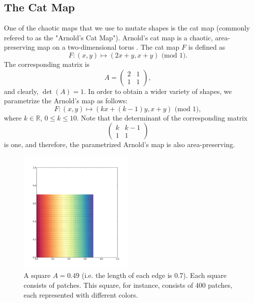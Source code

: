 \documentclass[12pt,draft]{reedmcm}
\begin{document}
\subsection{The Cat Map}
One of the chaotic maps that we use to mutate shapes is the cat map (commonly refered to as the "Arnold's Cat Map").
Arnold's cat map is a chaotic, area-preserving map on a two-dimensional torus \citep{hilborn}.
The cat map $F$ is defined as
\begin{equation*}
  F: (x,y) \mapsto (2x + y, x + y) \mbox{ (mod 1)}.
\end{equation*}
The corresponding matrix is
\begin{equation*}
A =
\begin{pmatrix}
    2 & 1  \\
    1 & 1  
  \end{pmatrix},
\end{equation*}
and clearly, $\det(A) = 1$.
In order to obtain a wider variety of shapes, we parametrize the Arnold's map as follows:
\begin{equation*}
  F: (x,y) \mapsto (kx + (k-1)y, x + y) \mbox{ (mod 1)},
\end{equation*}
where $k \in \mathbb{R}$, $0 \leq k \leq 10$.
Note that the determinant of the corresponding matrix
\begin{equation*}
\begin{pmatrix}
    k & k-1  \\
    1 & 1  
  \end{pmatrix}
\end{equation*}
is one, and therefore, the parametrized Arnold's map is also area-preserving.
\begin{figure}[p]
  \centering
  \includegraphics[width=0.5\textwidth]{square_049_900}
  \caption{A square $A = 0.49$ (i.e. the length of each edge is 0.7). Each square consists of patches. This square, for instance, consists of 400 patches, each represented with different colors.}
  \label{fig:square}
\end{figure}
\end{document}
